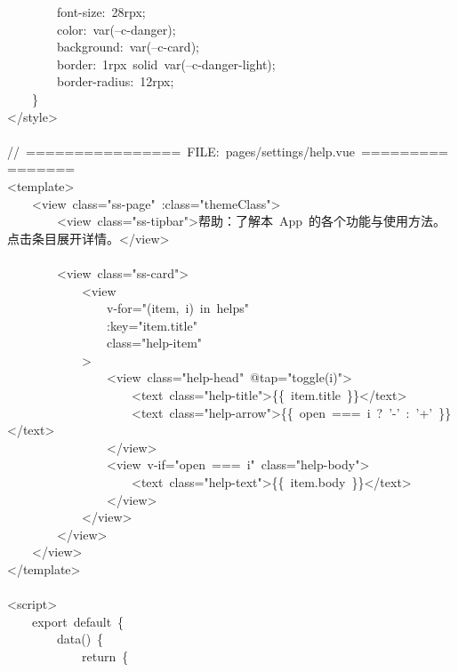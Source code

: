 \documentclass[a4paper,10pt]{article}
\begin{document}
{\ttfamily\footnotesize\raggedright
~~~~~~~~font-size:~28rpx;\\
~~~~~~~~color:~var(--c-danger);\\
~~~~~~~~background:~var(--c-card);\\
~~~~~~~~border:~1rpx~solid~var(--c-danger-light);\\
~~~~~~~~border-radius:~12rpx;\\
~~~~\}\\
</style>\\
\mbox{}\\
//~================~FILE:~pages/settings/help.vue~================\\
<template>\\
~~~~<view~class="ss-page"~:class="themeClass">\\
~~~~~~~~<view~class="ss-tipbar">帮助：了解本~App~的各个功能与使用方法。点击条目展开详情。</view>\\
\mbox{}\\
~~~~~~~~<view~class="ss-card">\\
~~~~~~~~~~~~<view\\
~~~~~~~~~~~~~~~~v-for="(item,~i)~in~helps"\\
~~~~~~~~~~~~~~~~:key="item.title"\\
~~~~~~~~~~~~~~~~class="help-item"\\
~~~~~~~~~~~~>\\
~~~~~~~~~~~~~~~~<view~class="help-head"~@tap="toggle(i)">\\
~~~~~~~~~~~~~~~~~~~~<text~class="help-title">\{\{~item.title~\}\}</text>\\
~~~~~~~~~~~~~~~~~~~~<text~class="help-arrow">\{\{~open~===~i~?~'-'~:~'+'~\}\}</text>\\
~~~~~~~~~~~~~~~~</view>\\
~~~~~~~~~~~~~~~~<view~v-if="open~===~i"~class="help-body">\\
~~~~~~~~~~~~~~~~~~~~<text~class="help-text">\{\{~item.body~\}\}</text>\\
~~~~~~~~~~~~~~~~</view>\\
~~~~~~~~~~~~</view>\\
~~~~~~~~</view>\\
~~~~</view>\\
</template>\\
\mbox{}\\
<script>\\
~~~~export~default~\{\\
~~~~~~~~data()~\{\\
~~~~~~~~~~~~return~\{\\
}
\end{document}
